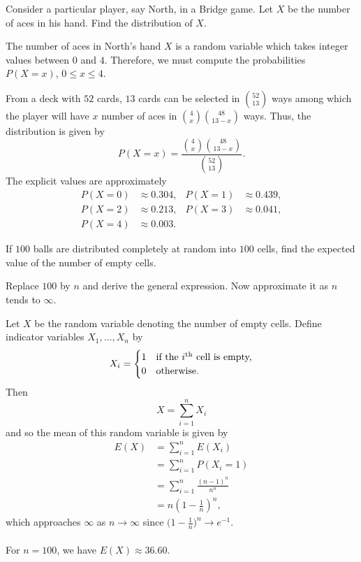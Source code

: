 \begin{problem}[Handout 1, \# 16]
  Consider a particular player, say North, in a Bridge game. Let \(X\) be
  the number of aces in his hand. Find the distribution of \(X\).
\end{problem}
\begin{solution*}
  The number of aces in North's hand \(X\) is a random variable which takes
  integer values between \(0\) and \(4\). Therefore, we must compute the
  probabilities \(P(X=x)\), \(0\leq x\leq 4\).

  From a deck with \(52\) cards, \(13\) cards can be selected in
  \(\binom{52}{13}\) ways among which the player will have \(x\) number of
  aces in \(\binom{4}{x}\binom{48}{13-x}\) ways. Thus, the distribution is
  given by
  \[
    P(X=x)=\frac{\binom{4}{x}\binom{48}{13-x}}{\binom{52}{13}}.
  \]
  The explicit values are approximately
  \begin{align*}
    P(X=0)&\approx 0.304,
    &P(X=1)&\approx 0.439,\\
    P(X=2)&\approx 0.213,
    &P(X=3)&\approx 0.041,\\
    P(X=4)&\approx 0.003.
  \end{align*}
\end{solution*}

\begin{problem}[Handout 1, \# 20]
  If \(100\) balls are distributed completely at random into \(100\) cells,
  find the expected value of the number of empty cells.

  \noindent Replace \(100\) by \(n\) and derive the general expression. Now
  approximate it as \(n\) tends to \(\infty\).
\end{problem}
\begin{solution*}
  Let \(X\) be the random variable denoting the number of empty
  cells. Define indicator variables \(X_1,\dotsc,X_n\) by
  \[
    X_i=
    \begin{cases}
      1&\text{if the \(i\)\textsuperscript{th} cell is empty,}\\
      0&\text{otherwise.}
    \end{cases}
  \]
  Then
  \[
    X=\sum_{i=1}^n X_i
  \]
  and so the mean of this random variable is given by
  \begin{align*}
    E(X)
    &=\sum_{i=1}^n E(X_i)\\
    &=\sum_{i=1}^n P(X_i=1)\\
    &=\sum_{i=1}^n\frac{(n-1)^n}{n^n}\\
    &=n\left(1-\frac{1}{n}\right)^n,
  \end{align*}
  which approaches \(\infty\) as \(n\to\infty\) since
  \(\bigl(1-\frac{1}{n}\bigr)^n\to e^{-1}\).
  \\\\
  For \(n=100\), we have \(E(X)\approx 36.60\).
\end{solution*}

